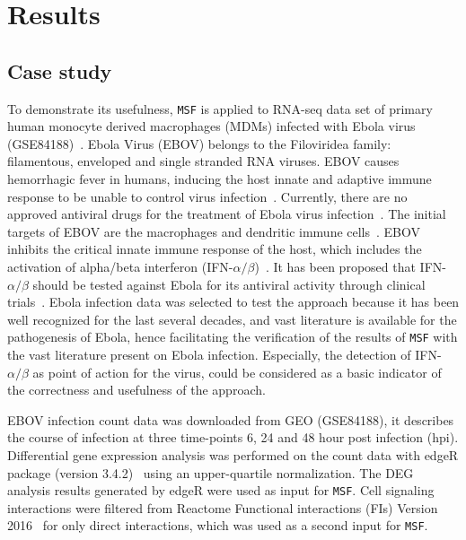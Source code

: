 \documentclass[10pt,a4paper,twocolumn]{article}
\begin{document}
	
	\section*{Results}
	
	\subsection*{Case study}
	
	To demonstrate its usefulness, \texttt{MSF} is applied to
        RNA-seq data set of primary human monocyte derived macrophages
        (MDMs) infected with Ebola virus (GSE84188)~\cite{Olejnik}. Ebola Virus (EBOV) belongs to the
        Filoviridea family: filamentous, enveloped and single stranded
        RNA viruses. EBOV causes hemorrhagic fever in humans, inducing
        the host innate and adaptive immune response to be unable to
        control virus infection~\cite{Prins}. Currently, there are no
        approved antiviral drugs for the treatment of Ebola virus
        infection~\cite{Konde,Rhein}.  The initial targets of EBOV are
        the macrophages and dendritic immune
        cells~\cite{Falasca,Rhein}. EBOV inhibits the critical innate
        immune response of the host, which includes the activation of
        alpha/beta interferon (IFN-$\alpha /
        \beta$)~\cite{Prins,Konde,Cardenas}. It has been proposed that
        IFN-$\alpha / \beta$ should be tested against Ebola for its
        antiviral activity through clinical trials~\cite{Konde}. Ebola
        infection data was selected to test the approach because it
        has been well recognized for the last several decades, and
        vast literature is available for the pathogenesis of Ebola,
        hence facilitating the verification of the results of
        \texttt{MSF} with the vast literature present on Ebola
        infection. Especially, the detection of IFN-$\alpha / \beta$
        as point of action for the virus, could be considered as a
        basic indicator of the correctness and usefulness of the
        approach.
	
	EBOV infection count data was downloaded from GEO (GSE84188),
        it describes the course of infection at three time-points 6,
        24 and 48 hour post infection (hpi). Differential gene
        expression analysis was performed on the count data with edgeR
        package (version 3.4.2)~\cite{edgeR} using an upper-quartile
        normalization. The DEG analysis results generated by edgeR
        were used as input for \texttt{MSF}. Cell signaling
        interactions were filtered from Reactome Functional
        interactions (FIs) Version 2016~\cite{Cytokegg} for only
        direct interactions, which was used as a second input for
        \texttt{MSF}.
	
\end{document}
